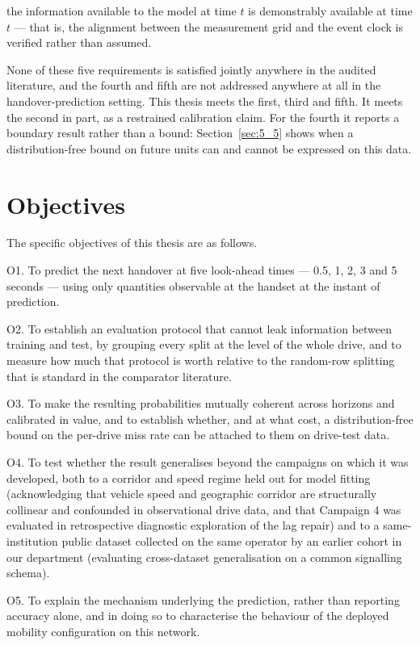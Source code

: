 the information available to the model at time $t$ is demonstrably available at time $t$ --- that is, the alignment between the measurement grid and the event clock is verified rather than assumed.

None of these five requirements is satisfied jointly anywhere in the audited literature, and the fourth and fifth are not addressed anywhere at all in the handover-prediction setting. This thesis meets the first, third and fifth. It meets the second in part, as a restrained calibration claim. For the fourth it reports a boundary result rather than a bound: Section~\ref{sec:5_5} shows when a distribution-free bound on future units can and cannot be expressed on this data.


\section{Objectives}
\label{sec:1_4}

The specific objectives of this thesis are as follows.

O1. To predict the next handover at five look-ahead times --- 0.5, 1, 2, 3 and 5 seconds --- using only quantities observable at the handset at the instant of prediction.

O2. To establish an evaluation protocol that cannot leak information between training and test, by grouping every split at the level of the whole drive, and to measure how much that protocol is worth relative to the random-row splitting that is standard in the comparator literature.

O3. To make the resulting probabilities mutually coherent across horizons and calibrated in value, and to establish whether, and at what cost, a distribution-free bound on the per-drive miss rate can be attached to them on drive-test data.

O4. To test whether the result generalises beyond the campaigns on which it was developed, both to a corridor and speed regime held out for model fitting (acknowledging that vehicle speed and geographic corridor are structurally collinear and confounded in observational drive data, and that Campaign 4 was evaluated in retrospective diagnostic exploration of the lag repair) and to a same-institution public dataset collected on the same operator by an earlier cohort in our department \cite{ref38} (evaluating cross-dataset generalisation on a common signalling schema).

O5. To explain the mechanism underlying the prediction, rather than reporting accuracy alone, and in doing so to characterise the behaviour of the deployed mobility configuration on this network.


